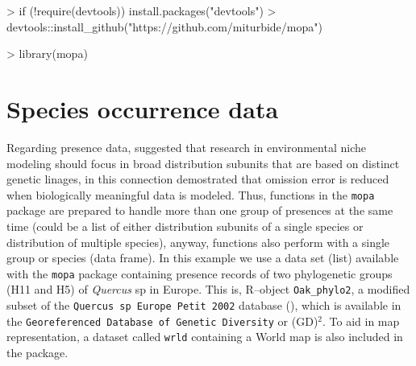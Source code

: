 \documentclass[10pt,a4paper]{report}
\begin{document}
\begin{Schunk}
\begin{Sinput}
> if (!require(devtools)) install.packages("devtools")
> devtools::install_github("https://github.com/miturbide/mopa")
\end{Sinput}
\end{Schunk}

\begin{Schunk}
\begin{Sinput}
> library(mopa)
\end{Sinput}
\end{Schunk}

\section{Species occurrence data}

Regarding presence data, \citet{hernandez_effect_2006} suggested that research in environmental niche modeling should focus in broad distribution subunits that are based on distinct genetic linages, in this connection \citet{gonzalez_population_2011} demostrated that omission error is reduced when biologically meaningful data is modeled. Thus, functions in the \texttt{mopa} package are prepared to handle more than one group of presences at the same time (could be a list of either distribution subunits of a single species or distribution of multiple species), anyway, functions also perform with a single group or species (data frame). In this example we use a data set (list) available with the \texttt{mopa} package containing presence records of two phylogenetic groups (H11 and H5) of \textit{Quercus} sp in Europe. This is, R--object \texttt{Oak\_phylo2}, a modified subset of the \texttt{Quercus sp Europe Petit 2002} database (\citet{petit_chloroplast_2002}), which is available in the \texttt{Georeferenced Database of Genetic Diversity} or (GD)$^{2}$. To aid in map representation, a dataset called \texttt{wrld} containing a World map is also included in the package. 
\end{document}
